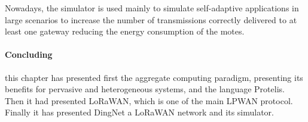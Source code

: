 Nowadays, the simulator is used mainly to simulate self-adaptive applications in large scenarios to increase the number of transmissions correctly delivered to at least one gateway reducing the energy consumption of the motes.

\paragraph{Concluding} this chapter has presented first the aggregate computing paradigm, presenting its benefits for pervasive and heterogeneous systems, and the language Protelis. Then it had presented LoRaWAN, which is one of the main LPWAN protocol. 
Finally it has presented DingNet a LoRaWAN network and its simulator.